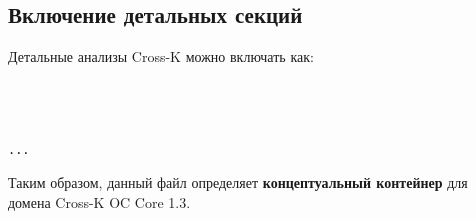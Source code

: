 \subsection{Включение детальных секций}
\noindent Детальные анализы Cross-K можно включать как:
\begin{verbatim}



...

\end{verbatim}

\noindent Таким образом, данный файл определяет \textbf{концептуальный контейнер}
для домена Cross-K OC Core 1.3.
